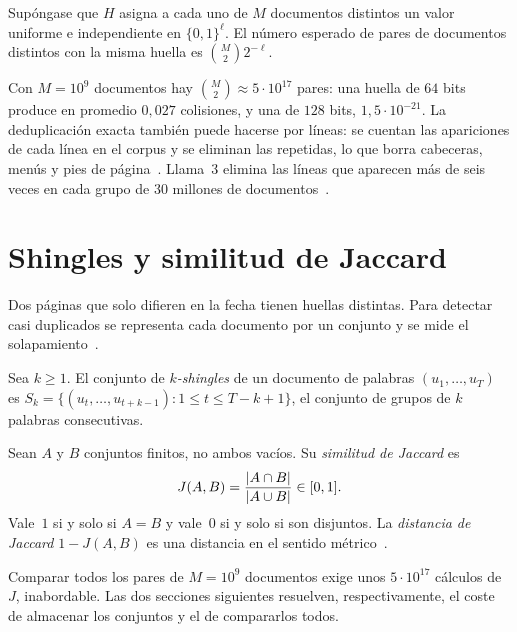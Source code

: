 \begin{proposicion}[Colisiones]\label{prop:colisiones}
Supóngase que $H$ asigna a cada uno de $M$ documentos distintos un valor uniforme e independiente en $\{0,1\}^{\ell}$. El número esperado de pares de documentos distintos con la misma huella es $\binom{M}{2}2^{-\ell}$.
\end{proposicion}

Con $M=10^{9}$ documentos hay $\binom{M}{2}\approx 5\cdot 10^{17}$ pares: una huella de $64$ bits produce en promedio $0{,}027$ colisiones, y una de $128$ bits, $1{,}5\cdot 10^{-21}$. La deduplicación exacta también puede hacerse por líneas: se cuentan las apariciones de cada línea en el corpus y se eliminan las repetidas, lo que borra cabeceras, menús y pies de página~\cite[§3.1]{cs336a4}. Llama~3 elimina las líneas que aparecen más de seis veces en cada grupo de $30$ millones de documentos~\cite[§3.1.1]{llama3}.

\section{Shingles y similitud de Jaccard}

Dos páginas que solo difieren en la fecha tienen huellas distintas. Para detectar casi duplicados se representa cada documento por un conjunto y se mide el solapamiento~\cite[§3.1]{mmds}.

\begin{definicion}[Shingles]
Sea $k\ge 1$. El conjunto de \emph{$k$-shingles} de un documento de palabras $(u_1,\dots,u_T)$ es $S_k=\{(u_t,\dots,u_{t+k-1}):1\le t\le T-k+1\}$, el conjunto de grupos de $k$ palabras consecutivas.
\end{definicion}

\begin{definicion}
Sean $A$ y $B$ conjuntos finitos, no ambos vacíos. Su \emph{similitud de Jaccard} es
\[
J(A,B)=\frac{\lvert A\cap B\rvert}{\lvert A\cup B\rvert}\in[0,1].
\]
Vale~$1$ si y solo si $A=B$ y vale~$0$ si y solo si son disjuntos. La \emph{distancia de Jaccard} $1-J(A,B)$ es una distancia en el sentido métrico~\cite[cap.~3]{mmds}.
\end{definicion}

\addtocounter{definicion}{1}%

Comparar todos los pares de $M=10^{9}$ documentos exige unos $5\cdot 10^{17}$ cálculos de $J$, inabordable. Las dos secciones siguientes resuelven, respectivamente, el coste de almacenar los conjuntos y el de compararlos todos.

